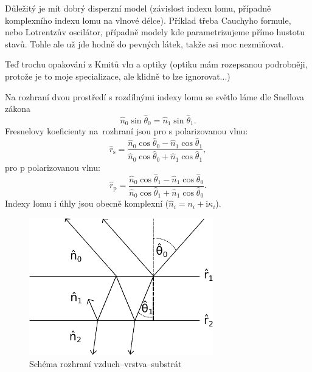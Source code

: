 \documentclass[12pt]{article}
\begin{document}
Důležitý je mít dobrý disperzní model (závislost indexu lomu, případně komplexního indexu lomu na vlnové délce). Příklad třeba Cauchyho formule, nebo Lotrentzův oscilátor, případně modely kde parametrizujeme přímo hustotu stavů. Tohle ale už jde hodně do pevných látek, takže asi moc nezmiňovat.

Teď trochu opakování z Kmitů vln a optiky (optiku mám rozepsanou podrobněji, protože je to moje specializace, ale klidně to lze ignorovat...)

Na rozhraní dvou prostředí s rozdílnými indexy lomu se světlo láme dle Snellova zákona
\begin{equation}
\hat{n}_0 \sin\hat{\theta}_0 = \hat{n}_1 \sin\hat{\theta}_1 \mathrm{.}
\end{equation}
Fresnelovy koeficienty na~rozhraní jsou pro s polarizovanou vlnu: 
\begin{equation}
\hat{r}_\mathrm{s} = \frac{ \hat{n}_0 \cos \hat{\theta}_0 - \hat{n}_1 \cos \hat{\theta}_1}{ \hat{n}_0 \cos \hat{\theta}_0 + \hat{n}_1 \cos \hat{\theta}_1}  \mathrm{,}
\end{equation}
pro p polarizovanou vlnu: 
\begin{equation}
\hat{r}_\mathrm{p} = \frac{ \hat{n}_0 \cos \hat{\theta}_1 - \hat{n}_1 \cos \hat{\theta}_0}{ \hat{n}_0 \cos \hat{\theta}_1 + \hat{n}_1 \cos \hat{\theta}_0}  \mathrm{.}
\end{equation}
Indexy lomu i úhly jsou obecně komplexní ($\hat{n}_i = n_i + \mathrm{i} \kappa_i$).

\begin{figure}
  \centering
  \includegraphics[width=80mm]{schema.pdf}
  \caption{Schéma rozhraní vzduch--vrstva--substrát}
  \label{schema}
\end{figure}
\end{document}
